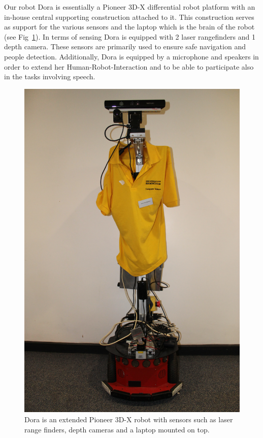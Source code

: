 Our robot Dora is essentially a Pioneer 3D-X differential robot platform with an in-house central supporting construction attached to it. This construction serves as support for the various sensors and the laptop which is the brain of the robot (see Fig~\ref{fig:dora}). In terms of sensing Dora is equipped with 2 laser rangefinders and 1 depth camera. These sensors are primarily used to ensure safe navigation 
and people detection. Additionally, Dora is equipped by a microphone and speakers in order to extend her Human-Robot-Interaction and to be able to participate also in the tasks involving speech.

 
\begin{figure}[!htb]
\centering
\includegraphics[width=2.in]{dora_new.png}
\caption{Dora is an extended Pioneer 3D-X robot with sensors such as laser range finders, depth cameras and a laptop mounted on top.}
\label{fig:dora}
\end{figure}  


